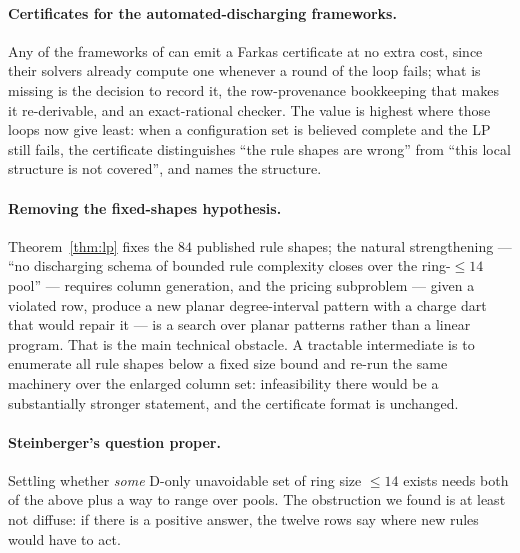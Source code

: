 \documentclass[11pt]{article}
\theoremstyle{definition}
\begin{document}
\paragraph{Certificates for the automated-discharging frameworks.} Any of the
frameworks of \cite{stolee2014,bousquet2024square,lavalicov2022} can emit a
Farkas certificate at no extra cost, since their solvers already compute one
whenever a round of the loop fails; what is missing is the decision to record it,
the row-provenance bookkeeping that makes it re-derivable, and an exact-rational
checker. The value is highest where those loops now give least: when a
configuration set is believed complete and the LP still fails, the certificate
distinguishes ``the rule shapes are wrong'' from ``this local structure is not
covered'', and names the structure.

\paragraph{Removing the fixed-shapes hypothesis.} Theorem~\ref{thm:lp} fixes the
$84$ published rule shapes; the natural strengthening --- ``no discharging schema
of bounded rule complexity closes over the ring-$\le14$ pool'' --- requires column
generation, and the pricing subproblem --- given a violated row, produce a new
planar degree-interval pattern with a charge dart that would repair it --- is a
search over planar patterns rather than a linear program. That is the main
technical obstacle. A tractable intermediate is to enumerate all rule shapes
below a fixed size bound and re-run the same machinery over the enlarged column
set: infeasibility there would be a substantially stronger statement, and the
certificate format is unchanged.

\paragraph{Steinberger's question proper.} Settling whether \emph{some} D-only
unavoidable set of ring size $\le14$ exists needs both of the above plus a way to
range over pools. The obstruction we found is at least not diffuse: if there is a
positive answer, the twelve rows say where new rules would have to act.
\end{document}
